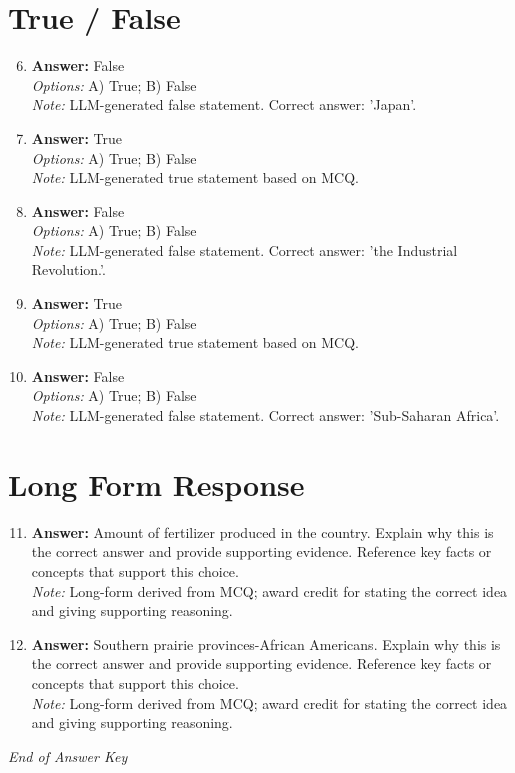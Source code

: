 \documentclass[12pt]{article}
\begin{document}
\section*{True / False}
\begin{enumerate}[label=\arabic*.]
\setcounter{enumi}{5}
\item \textbf{Answer:} False
\\ \textit{Options:} A) True; B) False
\\ \textit{Note:} LLM-generated false statement. Correct answer: 'Japan'.
\item \textbf{Answer:} True
\\ \textit{Options:} A) True; B) False
\\ \textit{Note:} LLM-generated true statement based on MCQ.
\item \textbf{Answer:} False
\\ \textit{Options:} A) True; B) False
\\ \textit{Note:} LLM-generated false statement. Correct answer: 'the Industrial Revolution.'.
\item \textbf{Answer:} True
\\ \textit{Options:} A) True; B) False
\\ \textit{Note:} LLM-generated true statement based on MCQ.
\item \textbf{Answer:} False
\\ \textit{Options:} A) True; B) False
\\ \textit{Note:} LLM-generated false statement. Correct answer: 'Sub-Saharan Africa'.
\end{enumerate}

\section*{Long Form Response}
\begin{enumerate}[label=\arabic*.]
\setcounter{enumi}{10}
\item \textbf{Answer:} Amount of fertilizer produced in the country. Explain why this is the correct answer and provide supporting evidence. Reference key facts or concepts that support this choice.
\\ \textit{Note:} Long-form derived from MCQ; award credit for stating the correct idea and giving supporting reasoning.
\item \textbf{Answer:} Southern prairie provinces-African Americans. Explain why this is the correct answer and provide supporting evidence. Reference key facts or concepts that support this choice.
\\ \textit{Note:} Long-form derived from MCQ; award credit for stating the correct idea and giving supporting reasoning.
\end{enumerate}

\vfill
\noindent\textit{End of Answer Key}
\end{document}

